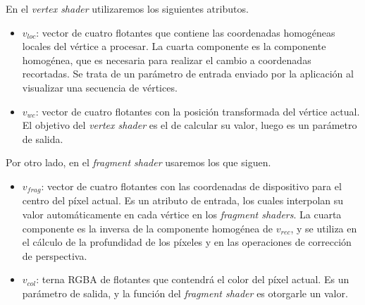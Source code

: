 En el \textit{vertex shader} utilizaremos los siguientes atributos.
\begin{itemize}
    \item $v_{loc}$: vector de cuatro flotantes que contiene las coordenadas
    homogéneas locales del vértice a procesar. La cuarta componente es la componente homogénea, que es necesaria para realizar el cambio a coordenadas recortadas. Se trata de un parámetro de entrada enviado por la aplicación al visualizar una secuencia de vértices.
    \item $v_{wc}$: vector de cuatro flotantes con la posición transformada del vértice actual. El objetivo del \textit{vertex shader} es el de calcular su valor, luego es un parámetro de salida. 
\end{itemize}
Por otro lado, en el \textit{fragment shader} usaremos los que siguen.
\begin{itemize}
    \item $v_{frag}$: vector de cuatro flotantes con las coordenadas de dispositivo para el centro del píxel actual. Es un atributo de entrada, los cuales interpolan su valor automáticamente en cada vértice en los \textit{fragment shaders}. La cuarta componente es la inversa de la componente homogénea de $v_{rec}$, y se utiliza en el cálculo de la profundidad de los píxeles y en las operaciones de corrección de perspectiva.
    \item $v_{col}$: terna RGBA de flotantes que contendrá el color del píxel actual. Es un parámetro de salida, y la función del \textit{fragment shader} es otorgarle un valor.
\end{itemize}

